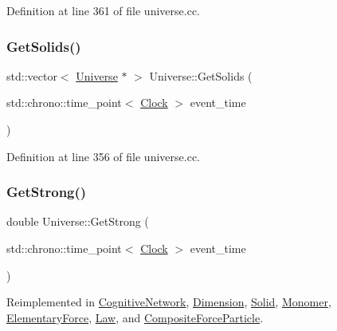 Definition at line 361 of file universe.\+cc.

\mbox{\label{class_universe_a669fc068dd7820a5af309bfbe67199aa}} 
\subsubsection{\texorpdfstring{Get\+Solids()}{GetSolids()}}
{\footnotesize\ttfamily std\+::vector$<$ \mbox{\hyperlink{class_universe}{Universe}} $\ast$ $>$ Universe\+::\+Get\+Solids (\begin{DoxyParamCaption}\item[{std\+::chrono\+::time\+\_\+point$<$ \mbox{\hyperlink{universe_8h_a0ef8d951d1ca5ab3cfaf7ab4c7a6fd80}{Clock}} $>$}]{event\+\_\+time }\end{DoxyParamCaption})}



Definition at line 356 of file universe.\+cc.

\mbox{\label{class_universe_acb453ce71da418c5b5617fecede9571b}} 
\subsubsection{\texorpdfstring{Get\+Strong()}{GetStrong()}}
{\footnotesize\ttfamily double Universe\+::\+Get\+Strong (\begin{DoxyParamCaption}\item[{std\+::chrono\+::time\+\_\+point$<$ \mbox{\hyperlink{universe_8h_a0ef8d951d1ca5ab3cfaf7ab4c7a6fd80}{Clock}} $>$}]{event\+\_\+time }\end{DoxyParamCaption})\hspace{0.3cm}{\ttfamily [virtual]}}



Reimplemented in \mbox{\hyperlink{class_cognitive_network_a277247686f8af159e7a7beb0ec379225}{Cognitive\+Network}}, \mbox{\hyperlink{class_dimension_ae36aadad4ae84735a5ff73bff4eb97b1}{Dimension}}, \mbox{\hyperlink{class_solid_ae39d0166456b8feaa39547e5a21c9096}{Solid}}, \mbox{\hyperlink{class_monomer_aa35033340e88c46757d1d5ccba21a21e}{Monomer}}, \mbox{\hyperlink{class_elementary_force_aaa1cde27b1508831f67353eb39745a7e}{Elementary\+Force}}, \mbox{\hyperlink{class_law_afd94bf09dbaf5d5df36b8f093db02dd9}{Law}}, and \mbox{\hyperlink{class_composite_force_particle_a9818d469c9841eaf77fbe329b0953354}{Composite\+Force\+Particle}}.



